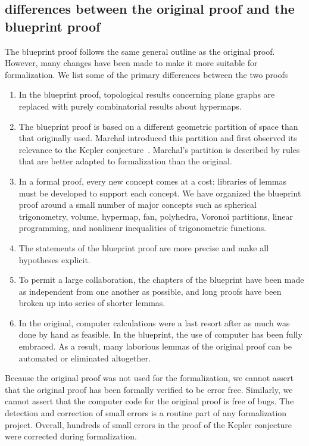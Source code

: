 \subsection{differences between the original proof and the blueprint
  proof}

The blueprint proof follows the same general outline as the original
proof.  However, many changes have been made to make it more suitable
for formalization.  We list some of the primary differences between
the two proofs

\begin{enumerate}
\item In the blueprint proof, topological results concerning plane
  graphs are replaced with purely combinatorial results about
  hypermaps.  
\item The blueprint proof is based on a different geometric partition
  of space than that originally used.  Marchal introduced this
  partition and first observed its relevance to the Kepler
  conjecture~\cite{Marchal11}.  Marchal's partition is described by
  rules that are better adapted to formalization than the original.
 \item In a formal proof, every new concept comes at a cost: libraries
   of lemmas must be developed to support each concept.  We have
   organized the blueprint proof around a small number of major
   concepts such as spherical trigonometry, volume, hypermap, fan,
   polyhedra, Voronoi partitions, linear programming, and nonlinear
   inequalities of trigonometric functions.
 \item The statements of the blueprint proof are more precise and
   make all hypotheses explicit.
 \item To permit a large collaboration, the chapters of the
   blueprint have been made as independent from one another as
   possible, and long proofs have been broken up into series of
   shorter lemmas.
\item In
  the original, computer calculations were a last resort after
  as much was done by hand as feasible.
  In the
  blueprint, the use of computer has been fully embraced.  As a
  result, many laborious lemmas of the original proof can be
  automated or eliminated altogether.
\end{enumerate}


Because the original proof was not used for the formalization, we
cannot assert that the original proof has been formally verified to be
error free.  Similarly, we cannot assert that the computer code for
the original proof is free of bugs.  The detection and correction of
small errors is a routine part of any formalization project.  Overall,
hundreds of small errors in the proof of the Kepler conjecture were
corrected during formalization.  

